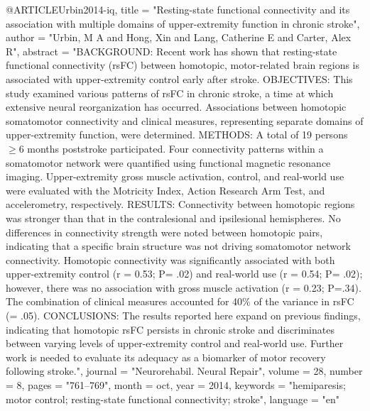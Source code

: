 @ARTICLE{Urbin2014-iq,
	title    = "Resting-state functional connectivity and its association with
	multiple domains of upper-extremity function in chronic stroke",
	author   = "Urbin, M A and Hong, Xin and Lang, Catherine E and Carter, Alex R",
	abstract = "BACKGROUND: Recent work has shown that resting-state functional
	connectivity (rsFC) between homotopic, motor-related brain
	regions is associated with upper-extremity control early after
	stroke. OBJECTIVES: This study examined various patterns of rsFC
	in chronic stroke, a time at which extensive neural
	reorganization has occurred. Associations between homotopic
	somatomotor connectivity and clinical measures, representing
	separate domains of upper-extremity function, were determined.
	METHODS: A total of 19 persons $\geq$6 months poststroke
	participated. Four connectivity patterns within a somatomotor
	network were quantified using functional magnetic resonance
	imaging. Upper-extremity gross muscle activation, control, and
	real-world use were evaluated with the Motricity Index, Action
	Research Arm Test, and accelerometry, respectively. RESULTS:
	Connectivity between homotopic regions was stronger than that in
	the contralesional and ipsilesional hemispheres. No differences
	in connectivity strength were noted between homotopic pairs,
	indicating that a specific brain structure was not driving
	somatomotor network connectivity. Homotopic connectivity was
	significantly associated with both upper-extremity control (r =
	0.53; P= .02) and real-world use (r = 0.54; P= .02); however,
	there was no association with gross muscle activation (r = 0.23;
	P=.34). The combination of clinical measures accounted for 40\%
	of the variance in rsFC (= .05). CONCLUSIONS: The results
	reported here expand on previous findings, indicating that
	homotopic rsFC persists in chronic stroke and discriminates
	between varying levels of upper-extremity control and real-world
	use. Further work is needed to evaluate its adequacy as a
	biomarker of motor recovery following stroke.",
	journal  = "Neurorehabil. Neural Repair",
	volume   =  28,
	number   =  8,
	pages    = "761--769",
	month    =  oct,
	year     =  2014,
	keywords = "hemiparesis; motor control; resting-state functional
	connectivity; stroke",
	language = "en"
}

